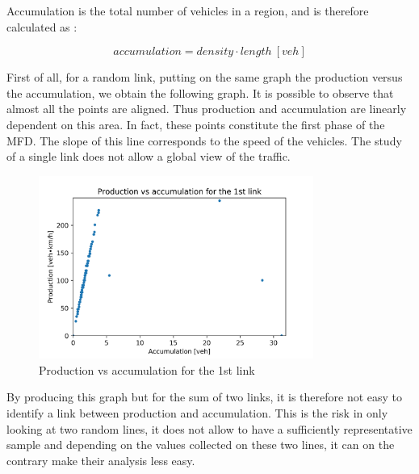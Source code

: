 \documentclass[a4paper, 12pt,oneside]{article}
\begin{document}
Accumulation is the total number of vehicles in a region, and is therefore calculated as :

\begin{equation}
       accumulation =  density \cdot length~[veh]
    \label{production}
\end{equation}

First of all, for a random link, putting on the same graph the production versus the accumulation, we obtain the following graph. 
It is possible to observe that almost all the points are aligned. Thus production and accumulation are linearly dependent on this area. In fact, these points constitute the first phase of the MFD. The slope of this line corresponds to the speed of the vehicles. The study of a single link does not allow a global view of the traffic.


\begin{figure}[H]
    \begin{center}
        \includegraphics[width=9cm]{Images/Production vs accumulation for the 1st link.png}
        \caption{Production vs accumulation for the 1st link}
        \label{Production vs accumulation for the 1st link}
    \end{center}
\end{figure}

By producing this graph but for the sum of two links, it is therefore not easy to identify a link between production and accumulation. This is the risk in only looking at two random lines, it does not allow to have a sufficiently representative sample and depending on the values collected on these two lines, it can on the contrary make their analysis less easy. 
\end{document}
